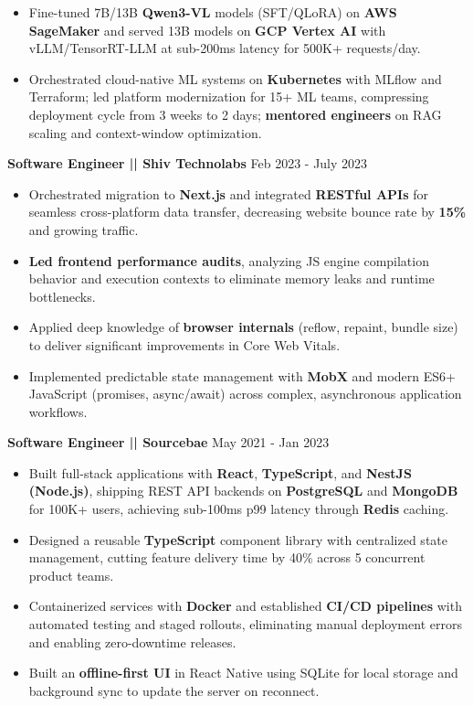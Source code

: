 \documentclass[a4paper]{article}
\begin{document}
\begin{itemize}
\item {Fine-tuned 7B/13B \textbf{Qwen3-VL} models (SFT/QLoRA) on \textbf{AWS SageMaker} and served 13B models on \textbf{GCP Vertex AI} with vLLM/TensorRT-LLM at sub-200ms latency for 500K+ requests/day.}
\item {Orchestrated cloud-native ML systems on \textbf{Kubernetes} with MLflow and Terraform; led platform modernization for 15+ ML teams, compressing deployment cycle from 3 weeks to 2 days; \textbf{mentored engineers} on RAG scaling and context-window optimization.}
\end{itemize}



\vspace{4pt}
\textbf{Software Engineer || Shiv Technolabs}
\hfill Feb 2023 - July 2023
\begin{itemize}
\vspace{1pt}

\item {Orchestrated migration to \textbf{Next.js} and integrated \textbf{RESTful APIs} for seamless cross-platform data transfer, decreasing website bounce rate by \textbf{15\%} and growing traffic.}
\item {\textbf{Led frontend performance audits}, analyzing JS engine compilation behavior and execution contexts to eliminate memory leaks and runtime bottlenecks.}
\item {Applied deep knowledge of \textbf{browser internals} (reflow, repaint, bundle size) to deliver significant improvements in Core Web Vitals.}
\item {Implemented predictable state management with \textbf{MobX} and modern ES6+ JavaScript (promises, async/await) across complex, asynchronous application workflows.}
\end{itemize}




\vspace{4pt}
\textbf{Software Engineer || Sourcebae}
\hfill May 2021 - Jan 2023
\begin{itemize}
\vspace{1pt}

\item {Built full-stack applications with \textbf{React}, \textbf{TypeScript}, and \textbf{NestJS (Node.js)}, shipping REST API backends on \textbf{PostgreSQL} and \textbf{MongoDB} for 100K+ users, achieving sub-100ms p99 latency through \textbf{Redis} caching.}
\item {Designed a reusable \textbf{TypeScript} component library with centralized state management, cutting feature delivery time by 40\% across 5 concurrent product teams.}
\item {Containerized services with \textbf{Docker} and established \textbf{CI/CD pipelines} with automated testing and staged rollouts, eliminating manual deployment errors and enabling zero-downtime releases.}
\item {Built an \textbf{offline-first UI} in React Native using SQLite for local storage and background sync to update the server on reconnect.}
\end{itemize}
\end{document}
